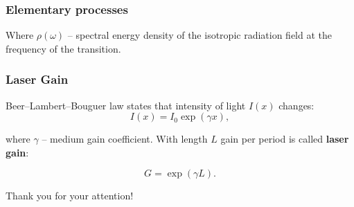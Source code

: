 \documentclass{beamer}
\begin{document}
	
	\begin{frame}
		\frametitle{Elementary processes}
		
%			
%
%		
		
		\vspace{10pt}
		\footnotesize
		Where $\rho(\omega)$ -- spectral energy density of the isotropic radiation field at the frequency of the transition.
	\end{frame}

	\begin{frame}
	\frametitle{Laser Gain}
	
	Beer–Lambert–Bouguer law states that intensity of light $I(x)$ changes:
	$$I(x) = I_0 \exp({\gamma x}),$$
	
	where $\gamma$ -- medium gain coefficient. With length $L$ gain per period is called \textbf{laser gain}:
	
	$$G = \exp{(\gamma L)}.$$
	\end{frame}
	
	\begin{frame}[plain,c]
		
		\begin{center}
			\huge {} Thank you for your attention!
		\end{center}
		
	\end{frame}
	
\end{document}
